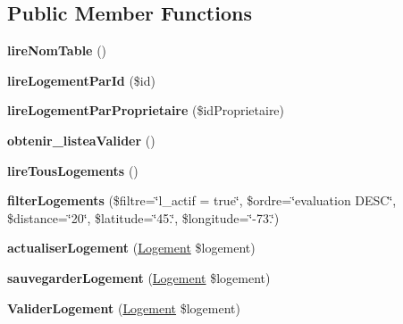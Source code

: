 \subsection*{Public Member Functions}
\begin{DoxyCompactItemize}
\item 
\mbox{\label{class_modele_logement_ab69829fd5155a4adc5fb20e0eae1bce1}} 
{\bfseries lire\+Nom\+Table} ()
\item 
\mbox{\label{class_modele_logement_abf452f447d42872c484b1c01cf55dac3}} 
{\bfseries lire\+Logement\+Par\+Id} (\$id)
\item 
\mbox{\label{class_modele_logement_ac08b04eb5f8263c0820448847cf82e31}} 
{\bfseries lire\+Logement\+Par\+Proprietaire} (\$id\+Proprietaire)
\item 
\mbox{\label{class_modele_logement_a48be572c2e72ed957684fb9dc85878f0}} 
{\bfseries obtenir\+\_\+listea\+Valider} ()
\item 
\mbox{\label{class_modele_logement_ab084a1c63e037b6e01ad6bf5786df392}} 
{\bfseries lire\+Tous\+Logements} ()
\item 
\mbox{\label{class_modele_logement_aeb7f51c1130253ac5142a6f4fbbce93e}} 
{\bfseries filter\+Logements} (\$filtre=\char`\"{}l\+\_\+actif = true\char`\"{}, \$ordre=\char`\"{}evaluation D\+E\+SC\char`\"{}, \$distance=\char`\"{}20\char`\"{}, \$latitude=\char`\"{}45.\char`\"{}, \$longitude=\char`\"{}-\/73.\char`\"{})
\item 
\mbox{\label{class_modele_logement_ab47f55be16a423cd0023c9986379805f}} 
{\bfseries actualiser\+Logement} (\hyperlink{class_logement}{Logement} \$logement)
\item 
\mbox{\label{class_modele_logement_a727596a87fedd1e5595cc4beb0456083}} 
{\bfseries sauvegarder\+Logement} (\hyperlink{class_logement}{Logement} \$logement)
\item 
\mbox{\label{class_modele_logement_ae2c0fe34901a2d03d006b76ea550aa17}} 
{\bfseries Valider\+Logement} (\hyperlink{class_logement}{Logement} \$logement)

\end{DoxyCompactItemize}
